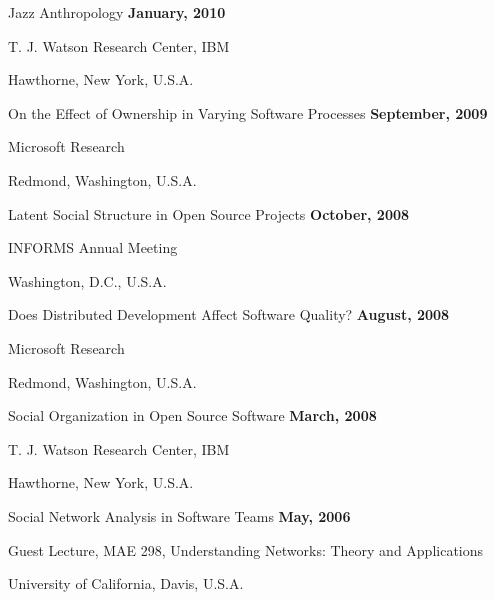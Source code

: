 \documentclass[margin,line,article]{res}
\newenvironment{list1}{
  \begin{list}{}{%
      \setlength{\itemsep}{0in}
      \setlength{\parsep}{0in} \setlength{\parskip}{0in}
      \setlength{\topsep}{0in} \setlength{\partopsep}{0in} 
      \setlength{\leftmargin}{0.17in}}}{\end{list}}
\begin{document}
\begin{resume}
Jazz Anthropology \hfill \textbf{January, 2010}\\
\vspace{-10pt}
\begin{list1}
\item T. J. Watson Research Center, IBM
\item Hawthorne, New York, U.S.A.
\end{list1}

On the Effect of Ownership in Varying Software Processes \hfill \textbf{September, 2009}\\
\vspace{-10pt}
\begin{list1}
\item Microsoft Research
\item Redmond, Washington, U.S.A.
\end{list1}

Latent Social Structure in Open Source Projects \hfill \textbf{October, 2008}\\
\vspace{-10pt}
\begin{list1}
\item INFORMS Annual Meeting
\item Washington, D.C., U.S.A.
\end{list1}

Does Distributed Development Affect Software Quality? \hfill \textbf{August, 2008}\\
\vspace{-10pt}
\begin{list1}
\item Microsoft Research
\item Redmond, Washington, U.S.A.
\end{list1}

Social Organization in Open Source Software \hfill \textbf{March, 2008}\\
\vspace{-10pt}
\begin{list1}
\item T. J. Watson Research Center, IBM
\item Hawthorne, New York, U.S.A.
\end{list1}

Social Network Analysis in Software Teams \hfill \textbf{May, 2006}\\
\vspace{-10pt}
\begin{list1}
\item Guest Lecture, MAE 298, Understanding Networks: Theory and Applications
\item University of California, Davis, U.S.A.
\end{list1}


\end{resume}
\end{document}
